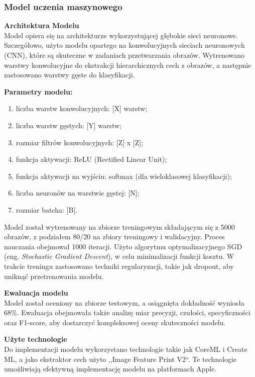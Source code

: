 \documentclass[12pt, a4paper, twoside, openany]{book}
\newcommand{\forceindent}{\leavevmode{\parindent=1.3em\indent}}
\begin{document}
\subsubsection{Model uczenia maszynowego}

\forceindent \textbf{Architektura Modelu\\}
\indent Model opiera się na architekturze wykorzystującej głębokie sieci neuronowe.
Szczegółowo, użyto modelu opartego na konwolucyjnych sieciach neuronowych (CNN), które są skuteczne w zadaniach przetwarzania obrazów.
Wytrenowano warstwy konwolucyjne do ekstrakcji hierarchicznych cech z obrazów, a następnie zastosowano warstwy gęste do klasyfikacji.

\textbf{Parametry modelu:}
\begin{enumerate}[label=--]
    \item liczba warstw konwolucyjnych: [X] warstw;
    \item liczba warstw gęstych: [Y] warstw;
    \item rozmiar filtrów konwolucyjnych: [Z] x [Z];
    \item funkcja aktywacji: ReLU (Rectified Linear Unit);
    \item funkcja aktywacji na wyjściu: softmax (dla wieloklasowej klasyfikacji);
    \item liczba neuronów na warstwie gęstej: [N];
    \item rozmiar batcha: [B].
\end{enumerate}

Model został wytrenowany na zbiorze treningowym składającym się z 5000 obrazów, z podziałem 80/20 na zbiory treningowy i walidacyjny.
Proces nauczania obejmował 1000 iteracji.
Użyto algorytmu optymalizacyjnego SGD (eng. \textit{Stochastic Gradient Descent}), w celu minimalizacji funkcji kosztu.
W trakcie treningu zastosowano techniki regularyzacji, takie jak dropout, aby uniknąć przetrenowania modelu.

\textbf{Ewaluacja modelu\\}
\forceindent Model został oceniony na zbiorze testowym, a osiągnięta dokładność wyniosła 68\%. 
Ewaluacja obejmowała także analizę miar precyzji, czułości, specyficzności oraz F1-score, aby dostarczyć kompleksowej oceny skuteczności modelu.

\textbf{Użyte technologie\\}
\forceindent Do implementacji modelu wykorzystano technologie takie jak CoreML i Create ML, a jako ekstraktor cech użyto ,,Image Feature Print V2``. 
Te technologie umożliwiają efektywną implementację modelu na platformach Apple.
\end{document}
